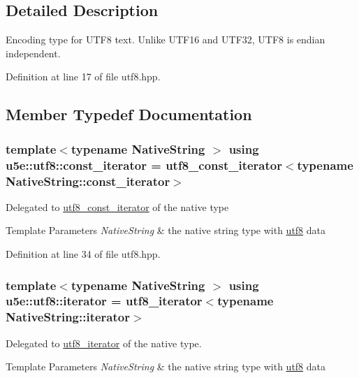 \subsection{Detailed Description}
Encoding type for U\+T\+F8 text. Unlike U\+T\+F16 and U\+T\+F32, U\+T\+F8 is endian independent. 

Definition at line 17 of file utf8.\+hpp.



\subsection{Member Typedef Documentation}
\subsubsection[{\texorpdfstring{const\+\_\+iterator}{const_iterator}}]{\setlength{\rightskip}{0pt plus 5cm}template$<$typename Native\+String $>$ using {\bf u5e\+::utf8\+::const\+\_\+iterator} =  {\bf utf8\+\_\+const\+\_\+iterator}$<$typename Native\+String\+::const\+\_\+iterator$>$}\hypertarget{classu5e_1_1utf8_a0a0e49f87a51183640beb235c89fd996}{}\label{classu5e_1_1utf8_a0a0e49f87a51183640beb235c89fd996}
Delegated to \hyperlink{classu5e_1_1utf8__const__iterator}{utf8\+\_\+const\+\_\+iterator} of the native type 
\begin{DoxyTemplParams}{Template Parameters}
{\em Native\+String} & the native string type with \hyperlink{classu5e_1_1utf8}{utf8} data \\
\hline
\end{DoxyTemplParams}


Definition at line 34 of file utf8.\+hpp.

\subsubsection[{\texorpdfstring{iterator}{iterator}}]{\setlength{\rightskip}{0pt plus 5cm}template$<$typename Native\+String $>$ using {\bf u5e\+::utf8\+::iterator} =  {\bf utf8\+\_\+iterator}$<$typename Native\+String\+::iterator$>$}\hypertarget{classu5e_1_1utf8_a4a1112036dbaf999d2c7752ac7536ea0}{}\label{classu5e_1_1utf8_a4a1112036dbaf999d2c7752ac7536ea0}
Delegated to \hyperlink{classu5e_1_1utf8__iterator}{utf8\+\_\+iterator} of the native type. 
\begin{DoxyTemplParams}{Template Parameters}
{\em Native\+String} & the native string type with \hyperlink{classu5e_1_1utf8}{utf8} data \\
\hline
\end{DoxyTemplParams}


